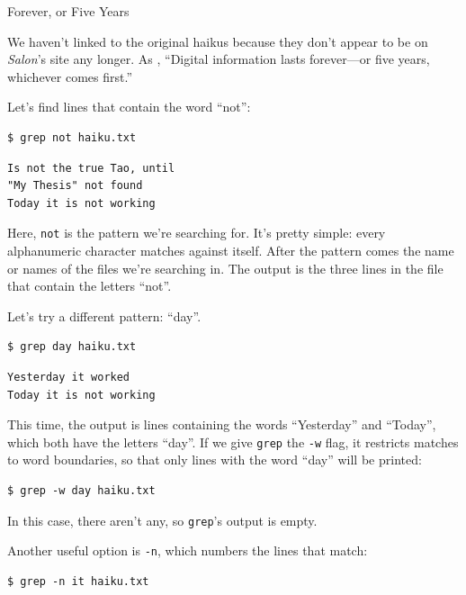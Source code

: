 \documentclass{book}
\begin{document}
\begin{swcbox}{Forever, or Five Years}

We haven't linked to the original haikus because they don't appear to be
on \emph{Salon}'s site any longer. As
, ``Digital information lasts forever---or five years, whichever
comes first.''

\end{swcbox}

Let's find lines that contain the word ``not'':

\begin{verbatim}
$ grep not haiku.txt
\end{verbatim}

\begin{verbatim}
Is not the true Tao, until
"My Thesis" not found
Today it is not working
\end{verbatim}

Here, \texttt{not} is the pattern we're searching for. It's pretty
simple: every alphanumeric character matches against itself. After the
pattern comes the name or names of the files we're searching in. The
output is the three lines in the file that contain the letters ``not''.

Let's try a different pattern: ``day''.

\begin{verbatim}
$ grep day haiku.txt
\end{verbatim}

\begin{verbatim}
Yesterday it worked
Today it is not working
\end{verbatim}

This time, the output is lines containing the words ``Yesterday'' and
``Today'', which both have the letters ``day''. If we give \texttt{grep}
the \texttt{-w} flag, it restricts matches to word boundaries, so that
only lines with the word ``day'' will be printed:

\begin{verbatim}
$ grep -w day haiku.txt
\end{verbatim}

In this case, there aren't any, so \texttt{grep}'s output is empty.

Another useful option is \texttt{-n}, which numbers the lines that
match:

\begin{verbatim}
$ grep -n it haiku.txt
\end{verbatim}
\end{document}
